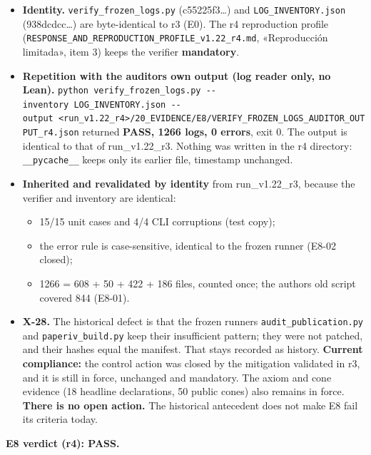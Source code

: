\documentclass[
]{article}
\providecommand{\tightlist}{%
  \setlength{\itemsep}{0pt}\setlength{\parskip}{0pt}}
\begin{document}
\begin{itemize}
\tightlist
\item
  \textbf{Identity.} \texttt{verify\_frozen\_logs.py} (c55225f3\ldots)
  and \texttt{LOG\_INVENTORY.json} (938dcdcc\ldots) are byte-identical
  to r3 (E0). The r4 reproduction profile
  (\texttt{RESPONSE\_AND\_REPRODUCTION\_PROFILE\_v1.22\_r4.md},
  «Reproducción limitada», item 3) keeps the verifier
  \textbf{mandatory}.
\item
  \textbf{Repetition with the auditor\textquotesingle s own output (log
  reader only, no Lean).}
  \texttt{python\ verify\_frozen\_logs.py\ -\/-inventory\ LOG\_INVENTORY.json\ -\/-output\ \textless{}run\_v1.22\_r4\textgreater{}/20\_EVIDENCE/E8/VERIFY\_FROZEN\_LOGS\_AUDITOR\_OUTPUT\_r4.json}
  returned \textbf{PASS, 1266 logs, 0 errors}, exit 0. The output is
  identical to that of run\_v1.22\_r3. Nothing was written in the r4
  directory: \texttt{\_\_pycache\_\_} keeps only its earlier file,
  timestamp unchanged.
\item
  \textbf{Inherited and revalidated by identity} from run\_v1.22\_r3,
  because the verifier and inventory are identical:

  \begin{itemize}
  \tightlist
  \item
    15/15 unit cases and 4/4 CLI corruptions (test copy);
  \item
    the error rule is case-sensitive, identical to the frozen runner
    (E8-02 closed);
  \item
    1266 = 608 + 50 + 422 + 186 files, counted once; the
    author\textquotesingle s old script covered 844 (E8-01).
  \end{itemize}
\item
  \textbf{X-28.} The historical defect is that the frozen runners
  \texttt{audit\_publication.py} and \texttt{paperiv\_build.py} keep
  their insufficient pattern; they were not patched, and their hashes
  equal the manifest. That stays recorded as history. \textbf{Current
  compliance:} the control action was closed by the mitigation validated
  in r3, and it is still in force, unchanged and mandatory. The axiom
  and cone evidence (18 headline declarations, 50 public cones) also
  remains in force. \textbf{There is no open action.} The historical
  antecedent does not make E8 fail its criteria today.
\end{itemize}

\textbf{E8 verdict (r4): PASS.}
\end{document}
